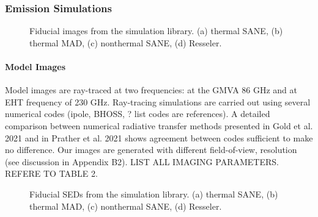 \subsubsection{Emission Simulations}

\begin{figure*}
  \caption{Fiducial images from the simulation library.
    (a) thermal SANE, (b) thermal MAD, (c) nonthermal SANE, (d)
    Resseler.
    }
  \label{fig:fiducial_imgs}
\end{figure*}

\paragraph{Model Images}
Model images are ray-traced at two frequencies: at the GMVA 86 GHz and at EHT frequency of 230 GHz. Ray-tracing simulations are carried out using several numerical codes (ipole, BHOSS, ? list codes are references). A detailed comparison between numerical radiative transfer methods presented in Gold et al. 2021 and in Prather et al. 2021 shows agreement between codes sufficient to make no difference. Our images are generated with different field-of-view, resolution (see discussion in Appendix B2).
LIST ALL IMAGING PARAMETERS. REFERE TO TABLE 2.

\begin{figure*}
  \caption{Fiducial SEDs from the simulation library.
    (a) thermal SANE, (b) thermal MAD, (c) nonthermal SANE, (d)
    Resseler.
    }
  \label{fig:fiducial_SEDs}
\end{figure*}

